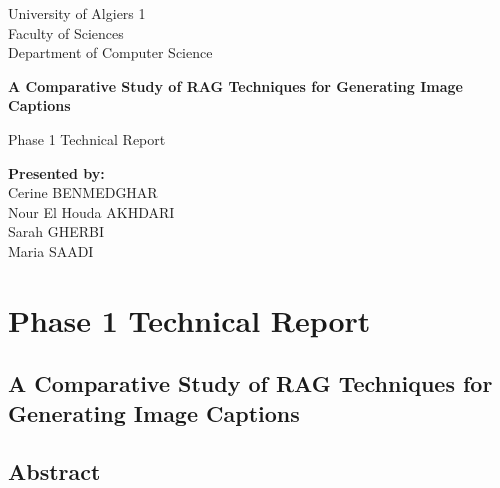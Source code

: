 \documentclass{article}
\begin{document}

\begin{titlepage}
    \centering
    \hypersetup{pageanchor=false}

    \vspace{1cm}

    {\Large University of Algiers 1}\\[0.3cm]
    {\large Faculty of Sciences}\\[0.3cm]
    {\large Department of Computer Science}

    \vspace{2cm}

    {\Huge\bfseries A Comparative Study of RAG Techniques for Generating Image Captions}

    \vspace{0.8cm}

    {\Large Phase 1 Technical Report}

\vfill

{\large\textbf{Presented by:}}\\[0.5cm]

Cerine BENMEDGHAR\\
Nour El Houda AKHDARI\\
Sarah GHERBI\\
Maria SAADI\\
    

    

\end{titlepage}
\hypersetup{pageanchor=true}
\setcounter{page}{1}


\tableofcontents

\newpage


\section*{Phase 1 Technical Report}
\label{phase-1-technical-report}

\subsection*{A Comparative Study of RAG Techniques for Generating Image Captions}
\label{a-comparative-study-of-rag-techniques-for-generating-image-captions}

\subsection*{Abstract}
\end{document}
